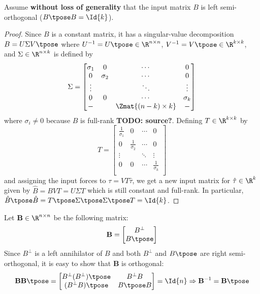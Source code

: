 \begin{assm}\label{assm:B-orthogonal}
    Assume \textbf{without loss of generality} that the input matrix \(B\) is
    left semi-orthogonal (\(B\tpose B = \Id{k}\)).
\end{assm}
\begin{proof}
Since \(B\) is a constant matrix, 
it has a singular-value decomposition 
\(B = U \Sigma V\tpose\) where \(U^{-1} = U\tpose \in \R^{n \times n}\), 
\(V^{-1} = V\tpose \in \R^{k \times k}\), and \(\Sigma \in \R^{n \times k}\) is
defined by
\[
    \Sigma = \begin{bmatrix}
        \sigma_1 & 0 & \cdots & 0 \\
        0 & \sigma_2 & \cdots & 0 \\
        \vdots & & \ddots & \vdots \\
        0 & 0 & \cdots & \sigma_k \\
        - &   & \Zmat{(n-k)\times k} & -  \\
    \end{bmatrix}
\]
where \(\sigma_i \neq 0\) because \(B\) is full-rank \textbf{TODO: source?}.
Defining \(T \in \R^{k \times k}\) by
\[
    T = \begin{bmatrix}
        \frac{1}{\sigma_1} & 0 & \cdots & 0 \\
        0 & \frac{1}{\sigma_2} & \cdots & 0 \\
    \vdots & & \ddots & \vdots \\
    0 & 0 & \cdots & \frac{1}{\sigma_k} \\
    \end{bmatrix}
\]
and assigning the input forces to \(\tau = V T \hat{\tau}\), we get a new input
matrix for \(\hat{\tau} \in \R^k\) given by \(\hat{B} = B V T = U \Sigma T\) 
which is still constant and full-rank. In particular, 
\(\hat{B}\tpose \hat{B} = T\tpose \Sigma\tpose \Sigma\tpose T = \Id{k}\).
\end{proof}

Let \(\mathbf{B} \in \R^{n\times n}\) be the following matrix:
\[
    \mathbf{B} = 
    \begin{bmatrix}
        B^\perp \\
        B\tpose \\
    \end{bmatrix}
\]
Since \(B^\perp\) is a left annihilator of \(B\) and both \(B^\perp\) and
\(B\tpose\) are right semi-orthogonal, it is easy to show that \(\mathbf{B}\) is
orthogonal:
\[
    \mathbf{B}\mathbf{B}\tpose = 
    \begin{bmatrix}
        B^\perp (B^\perp)\tpose & B^\perp B \\
        (B^\perp B)\tpose & B\tpose B
    \end{bmatrix} = \Id{n}
    \Rightarrow
    \mathbf{B}^{-1} = \mathbf{B}\tpose
\]

